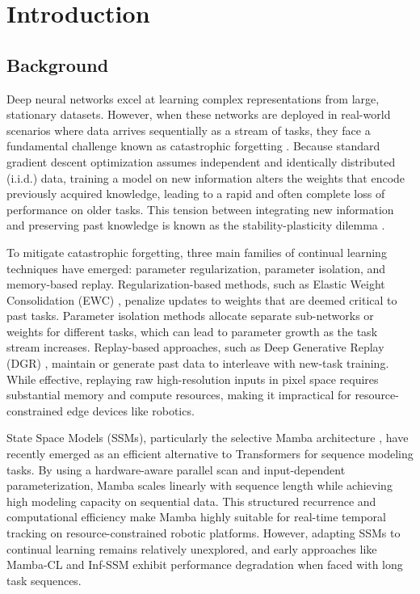 

\chapter{Introduction}
\label{chap:introduction}

\section{Background}
\label{sec:background}

Deep neural networks excel at learning complex representations from large, stationary datasets. However, when these networks are deployed in real-world scenarios where data arrives sequentially as a stream of tasks, they face a fundamental challenge known as catastrophic forgetting \cite{kirkpatrickOvercomingCatastrophicForgetting2017}. Because standard gradient descent optimization assumes independent and identically distributed (i.i.d.) data, training a model on new information alters the weights that encode previously acquired knowledge, leading to a rapid and often complete loss of performance on older tasks. This tension between integrating new information and preserving past knowledge is known as the stability-plasticity dilemma \cite{langeContinualLearningSurvey2021}.

To mitigate catastrophic forgetting, three main families of continual learning techniques have emerged: parameter regularization, parameter isolation, and memory-based replay. Regularization-based methods, such as Elastic Weight Consolidation (EWC) \cite{kirkpatrickOvercomingCatastrophicForgetting2017}, penalize updates to weights that are deemed critical to past tasks. Parameter isolation methods allocate separate sub-networks or weights for different tasks, which can lead to parameter growth as the task stream increases. Replay-based approaches, such as Deep Generative Replay (DGR) \cite{shinContinualLearningDeep2017}, maintain or generate past data to interleave with new-task training. While effective, replaying raw high-resolution inputs in pixel space requires substantial memory and compute resources, making it impractical for resource-constrained edge devices like robotics.

State Space Models (SSMs), particularly the selective Mamba architecture \cite{guMambaLinearTimeSequence2024}, have recently emerged as an efficient alternative to Transformers for sequence modeling tasks. By using a hardware-aware parallel scan and input-dependent parameterization, Mamba scales linearly with sequence length while achieving high modeling capacity on sequential data. This structured recurrence and computational efficiency make Mamba highly suitable for real-time temporal tracking on resource-constrained robotic platforms. However, adapting SSMs to continual learning remains relatively unexplored, and early approaches like Mamba-CL \cite{chengMambaCLOptimizingSelective2025} and Inf-SSM \cite{leeExemplarFreeContinualLearning2026} exhibit performance degradation when faced with long task sequences.

